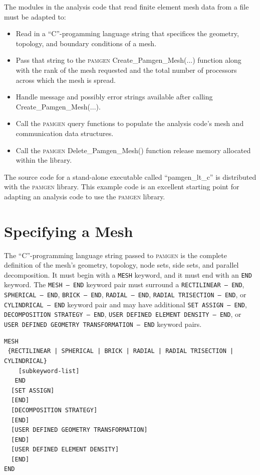 The modules in the analysis code that read finite element mesh data from a file must be adapted to:
\begin{itemize}\addtolength{\itemsep}{-0.5\baselineskip}
\item Read in a ``C''-progamming language string that specifices the geometry, topology, and boundary conditions of a mesh.
\item Pass that string to the \textsc{pamgen} Create\_Pamgen\_Mesh(...) function along with the rank of the mesh requested and the total number of processors across which the mesh is spread. 
\item Handle message and possibly error strings available after calling Create\_Pamgen\_Mesh(...).
\item Call the \textsc{pamgen} query functions to populate the analysis code's mesh and communication data structures.
\item Call the \textsc{pamgen} Delete\_Pamgen\_Mesh() function release memory allocated within the library.
\end{itemize}

The source code for a stand-alone executable called ``pamgen\_lt\_c'' is distributed with the \textsc{pamgen} library. This example code is an excellent starting point for adapting an analysis code to use the \textsc{pamgen} library.


\clearpage
\section{Specifying a Mesh}\label{sec:specifying_a_mesh}

The ``C''-programming language string passed to \textsc{pamgen} is the complete definition of the mesh's geometry, topology, node sets, side sets, and parallel decomposition. It must begin with a \texttt{MESH} keyword, and it must end with an \texttt{END} keyword. The \texttt{MESH -- END} keyword pair must surround a \texttt{RECTILINEAR --
END}, \texttt{SPHERICAL -- END}, \texttt{BRICK -- END}, \texttt{RADIAL -- END}, \texttt{RADIAL TRISECTION -- END}, or \texttt{CYLINDRICAL -- END}
keyword pair and may have additional \texttt{SET ASSIGN -- END}, \texttt{DECOMPOSITION STRATEGY -- END},
\texttt{USER DEFINED ELEMENT DENSITY -- END}, or \texttt{USER DEFINED GEOMETRY TRANSFORMATION -- END} keyword pairs.

{\ttfamily \begin{verbatim}
MESH
 {RECTILINEAR | SPHERICAL | BRICK | RADIAL | RADIAL TRISECTION | CYLINDRICAL}
    [subkeyword-list]
   END
  [SET ASSIGN]
  [END]
  [DECOMPOSITION STRATEGY]
  [END]
  [USER DEFINED GEOMETRY TRANSFORMATION]
  [END]
  [USER DEFINED ELEMENT DENSITY]
  [END]
END
\end{verbatim}
}

